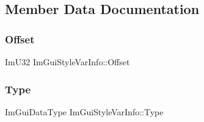 \subsection{Member Data Documentation}
\hypertarget{struct_im_gui_style_var_info_ae900d6a02166d3d0433c18b95aec10e8}{}\label{struct_im_gui_style_var_info_ae900d6a02166d3d0433c18b95aec10e8} 
\subsubsection{\texorpdfstring{Offset}{Offset}}
{\footnotesize\ttfamily Im\+U32 Im\+Gui\+Style\+Var\+Info\+::\+Offset}

\hypertarget{struct_im_gui_style_var_info_a62f42d2bb7b71b7530493e16e622cb81}{}\label{struct_im_gui_style_var_info_a62f42d2bb7b71b7530493e16e622cb81} 
\subsubsection{\texorpdfstring{Type}{Type}}
{\footnotesize\ttfamily Im\+Gui\+Data\+Type Im\+Gui\+Style\+Var\+Info\+::\+Type}

